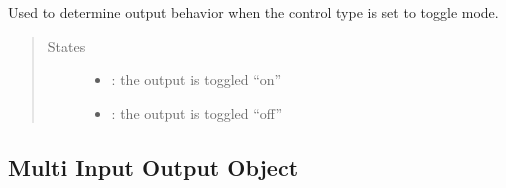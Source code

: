 \documentclass[letterpaper,10pt,english]{sphinxmanual}
\begin{document}

\begin{fulllineitems}
\label{\detokenize{base:OutputObject.ToggleState}}
\sphinxAtStartPar
Used to determine output behavior when the control type is set to toggle mode.
\begin{quote}\begin{description}
\item[{States}] \leavevmode\begin{itemize}
\item {} 
\sphinxAtStartPar
{} : the output is toggled “on”

\item {} 
\sphinxAtStartPar
{} : the output is toggled “off”

\end{itemize}

\end{description}\end{quote}

\end{fulllineitems}



\subsection{Multi Input Output Object}
\label{\detokenize{base:module-MultiInputOutputObject}}\label{\detokenize{base:multi-input-output-object}}
\end{document}
